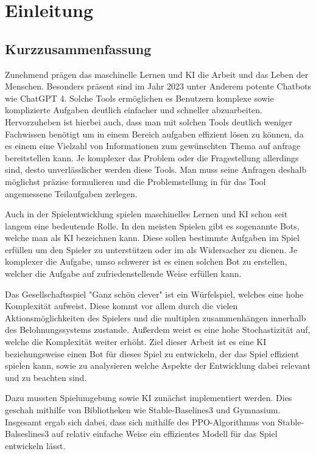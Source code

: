 \section{Einleitung}
\subsection{Kurzzusammenfassung}
Zunehmend prägen das maschinelle Lernen und KI die Arbeit und das Leben der Menschen. Besonders präsent sind im Jahr 2023 unter Anderem potente Chatbots wie ChatGPT 4. Solche Tools ermöglichen es Benutzern komplexe sowie komplizierte Aufgaben deutlich einfacher und schneller abzuarbeiten. Hervorzuheben ist hierbei auch, dass man mit solchen Tools deutlich weniger Fachwissen benötigt um in einem Bereich aufgaben effizient lösen zu können, da es einem eine Vielzahl von Informationen zum gewünschten Thema auf anfrage bereitstellen kann. Je komplexer das Problem oder die Fragestellung allerdings sind, desto unverlässlicher werden diese Tools. Man muss seine Anfragen deshalb möglichst präzise formulieren und die Problemstellung in für das Tool angemessene Teilaufgaben zerlegen.

Auch in der Spielentwicklung spielen maschinelles Lernen und KI schon seit langem eine bedeutende Rolle. In den meisten Spielen gibt es sogenannte Bots, welche man als KI bezeichnen kann. Diese sollen bestimmte Aufgaben im Spiel erfüllen um den Spieler zu unterstützen oder im als Widersacher zu dienen. Je komplexer die Aufgabe, umso schwerer ist es einen solchen Bot zu erstellen, welcher die Aufgabe auf zufriedenstellende Weise erfüllen kann.

Das Gesellschaftsspiel "Ganz schön clever" ist ein Würfelspiel, welches eine hohe Komplexität aufweist. Diese kommt vor allem durch die vielen Aktionsmöglichkeiten des Spielers und die multiplen zusammenhängen innerhalb des Belohnungssystems zustande. Außerdem weist es eine hohe Stochastizität auf, welche die Komplexität weiter erhöht.
Ziel dieser Arbeit ist es eine KI beziehungsweise einen Bot für dieses Spiel zu entwickeln, der das Spiel effizient spielen kann, sowie zu analysieren welche Aspekte der Entwicklung dabei relevant und zu beachten sind.

Dazu mussten Spielumgebung sowie KI zunächst implementiert werden. Dies geschah mithilfe von Bibliotheken wie Stable-Baselines3 und Gymnasium.
Insgesamt ergab sich dabei, dass sich mithilfe des PPO-Algorithmus von Stable-Balseslines3 auf relativ einfache Weise ein effizientes Modell für das Spiel entwickeln lässt.
